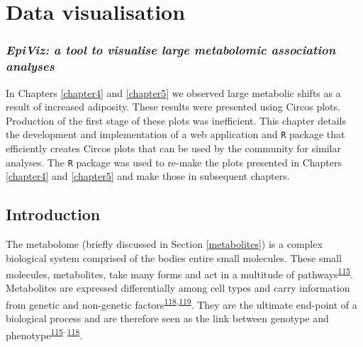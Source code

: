 \documentclass[11pt,twoside]{bristolthesis}
\begin{document}
\hypertarget{chapter6}{%
\chapter{Data visualisation}\label{chapter6}}

\hypertarget{epiviz-a-tool-to-visualise-large-metabolomic-association-analyses}{%
\subsection*{\texorpdfstring{\emph{EpiViz: a tool to visualise large metabolomic association analyses}}{EpiViz: a tool to visualise large metabolomic association analyses}}\label{epiviz-a-tool-to-visualise-large-metabolomic-association-analyses}}

In Chapters \ref{chapter4} and \ref{chapter5} we observed large metabolic shifts as a result of increased adiposity. These results were presented using Circos plots. Production of the first stage of these plots was inefficient. This chapter details the development and implementation of a web application and \texttt{R} package that efficiently creates Circos plots that can be used by the community for similar analyses. The \texttt{R} package was used to re-make the plots presented in Chapters \ref{chapter4} and \ref{chapter5} and make those in subsequent chapters.

\newpage

\hypertarget{introduction}{%
\section{Introduction}\label{introduction}}

The metabolome (briefly discussed in Section \ref{metabolites}) is a complex biological system comprised of the bodies entire small molecules. These small molecules, metabolites, take many forms and act in a multitude of pathways\textsuperscript{\protect\hyperlink{ref-Griffin2006}{115}}. Metabolites are expressed differentially among cell types and carry information from genetic and non-genetic factors\textsuperscript{\protect\hyperlink{ref-Wishart2019}{118},\protect\hyperlink{ref-Johnson2016}{119}}. They are the ultimate end-point of a biological process and are therefore seen as the link between genotype and phenotype\textsuperscript{\protect\hyperlink{ref-Griffin2006}{115}--\protect\hyperlink{ref-Wishart2019}{118}}.
\end{document}
